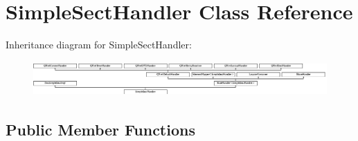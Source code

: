 \hypertarget{class_simple_sect_handler}{}\section{Simple\+Sect\+Handler Class Reference}
\label{class_simple_sect_handler}
Inheritance diagram for Simple\+Sect\+Handler\+:\begin{figure}[H]
\begin{center}
\leavevmode
\includegraphics[height=1.338912cm]{class_simple_sect_handler}
\end{center}
\end{figure}
\subsection*{Public Member Functions}
